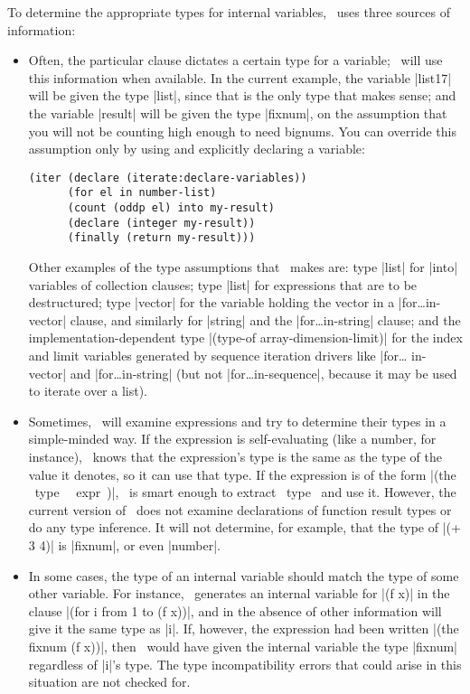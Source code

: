 To determine the appropriate types for internal variables, \iter\ uses
three sources of information:

\begin{itemize}

\item Often, the particular clause dictates a certain type for a
variable; \iter\ will use this information when available.  In the
current example, the variable |list17| will be given the type
|list|, since that is the only type that makes sense; and the
variable |result| will be given the type |fixnum|, on the
assumption that you will not be counting high enough to need bignums.
You can override this assumption only by using and explicitly declaring a
variable: 
\begin{verbatim}
(iter (declare (iterate:declare-variables))
      (for el in number-list)
      (count (oddp el) into my-result)
      (declare (integer my-result))
      (finally (return my-result)))
\end{verbatim}

\begin{sloppypar}
Other examples of the type assumptions that \iter\ makes are: type
|list| for |into| variables of collection clauses; type |list| for
expressions that are to be destructured; type |vector| for the
variable holding the vector in a |for\dots in-vector| clause, and
similarly for |string| and the |for\dots in-string| clause;
and the implementation-dependent type
|(type-of array-dimension-limit)| for the index and limit
variables generated by sequence iteration drivers like |for\dots
in-vector| and |for\dots in-string| (but not |for\dots in-sequence|,
because it may be used to iterate over a list). 
\end{sloppypar}

\item Sometimes, \iter\ will examine expressions and try to determine
their types in a simple-minded way.  If the expression is
self-evaluating (like a number, for instance), \iter\ knows that the
expression's type is the same as the type of the value it denotes, so
it can use that type.  If the expression is of the form |(the ~type~
~expr~)|, \iter\ is smart enough to extract ~type~ and use it.
However, the current version of \iter\ does not  
examine declarations of function result types or do any type
inference.  It will not determine, for 
example, that the type of |(+ 3 4)| is |fixnum|, or even
|number|.

\item In some cases, the type of an internal variable should match the
type of some other variable.  For instance, \iter\ generates an
internal variable for |(f x)| in the
clause |(for i from 1 to (f x))|, and in the absence of other
information will give it the same type as |i|.  If, however, the
expression had been written |(the fixnum (f x))|, then \iter\
would have given the internal variable the type |fixnum|
regardless of |i|'s type.  The type incompatibility errors that
could arise in this situation are not checked for.

\end{itemize}

